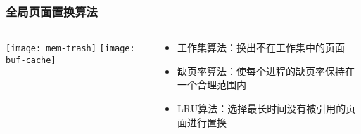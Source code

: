\begin{frame}[plain]
	\frametitle{全局页面置换算法}
	\begin{columns}
		\begin{column}{.4\textwidth}
			\centering
			\texttt{[image: mem-trash]}
			\texttt{[image: buf-cache]}
		\end{column}
		
		\begin{column}{.6\textwidth}
			
				\begin{itemize}\large
					\item 工作集算法：换出不在工作集中的页面
					\item 缺页率算法：使每个进程的缺页率保持在一个合理范围内
					\item LRU算法：选择最长时间没有被引用的页面进行置换
				\end{itemize}
			
		\end{column}
		
		
	\end{columns}
\end{frame}


